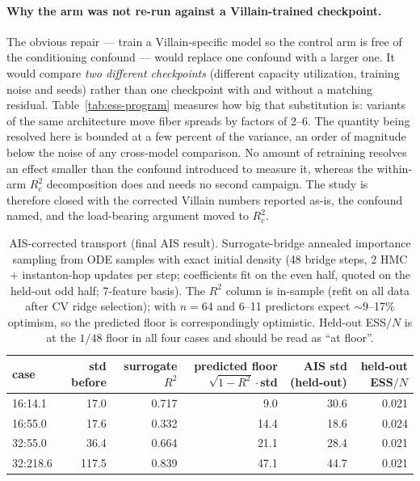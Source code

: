 \paragraph{Why the arm was not re-run against a Villain-trained checkpoint.}
The obvious repair --- train a Villain-specific model so the control arm is
free of the conditioning confound --- would replace one confound with a larger
one. It would compare \emph{two different checkpoints} (different capacity
utilization, training noise and seeds) rather than one checkpoint with and
without a matching residual. Table~\ref{tab:ess-program} measures how big that
substitution is: variants of the same architecture move fiber spreads by
factors of 2--6. The quantity being resolved here is bounded at a few percent
of the variance, an order of magnitude below the noise of any cross-model
comparison. No amount of retraining resolves an effect smaller than the
confound introduced to measure it, whereas the within-arm $R^2_c$
decomposition does and needs no second campaign. The study is therefore closed
with the corrected Villain numbers reported as-is, the confound named, and the
load-bearing argument moved to $R^2_c$.

\begin{table}[p]
  \centering
  \caption{AIS-corrected transport (final AIS result). Surrogate-bridge
  annealed importance sampling from ODE samples with exact initial density
  (48 bridge steps, 2 HMC $+$ instanton-hop updates per step; coefficients
  fit on the even half, quoted on the held-out odd half; 7-feature basis).
  The $R^2$ column is in-sample (refit on all data after CV ridge selection);
  with $n = 64$ and 6--11 predictors expect ${\sim}9$--17\% optimism, so the
  predicted floor is correspondingly optimistic. Held-out ESS$/N$ is at the
  $1/48$ floor in all four cases and should be read as ``at floor''.}
  \label{tab:ais-transport}
  \begin{tabular}{lrrrrr}
    \toprule
    case & std before & surrogate $R^2$ & predicted floor
    $\sqrt{1-R^2}\cdot$std & AIS std (held-out) & held-out ESS$/N$ \\
    \midrule
    16:14.1  & 17.0  & 0.717 & 9.0  & 30.6 & 0.021 \\
    16:55.0  & 17.6  & 0.332 & 14.4 & 18.6 & 0.024 \\
    32:55.0  & 36.4  & 0.664 & 21.1 & 28.4 & 0.021 \\
    32:218.6 & 117.5 & 0.839 & 47.1 & 44.7 & 0.021 \\
    \bottomrule
  \end{tabular}
\end{table}

